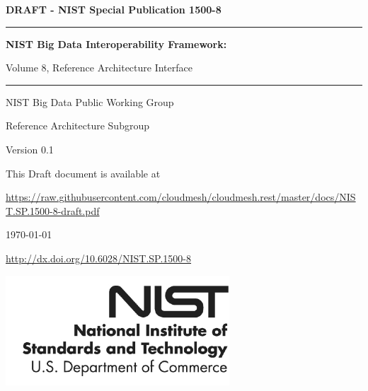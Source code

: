 %
%


\begin{flushright}
{\Large\bf DRAFT - NIST Special Publication 1500-8} 

\bigskip\bigskip

\hrule
\bigskip\bigskip

{\Huge\bf \sf
NIST Big Data Interoperability Framework:

\bigskip

Volume 8, Reference Architecture Interface
}


\bigskip\bigskip
\hrule

\vspace{2cm}

{\large

NIST Big Data Public Working Group

Reference Architecture Subgroup

\vspace{2cm}

Version 0.1

\bigskip

This Draft document is available at

{\small \url{https://raw.githubusercontent.com/cloudmesh/cloudmesh.rest/master/docs/NIST.SP.1500-8-draft.pdf}}


\bigskip

\today

\bigskip
\url{http://dx.doi.org/10.6028/NIST.SP.1500-8}

}
\vspace{2cm}

\vfill

\begin{flushright}
\includegraphics{images/nist.png}
\end{flushright}

\end{flushright}

\newpage

